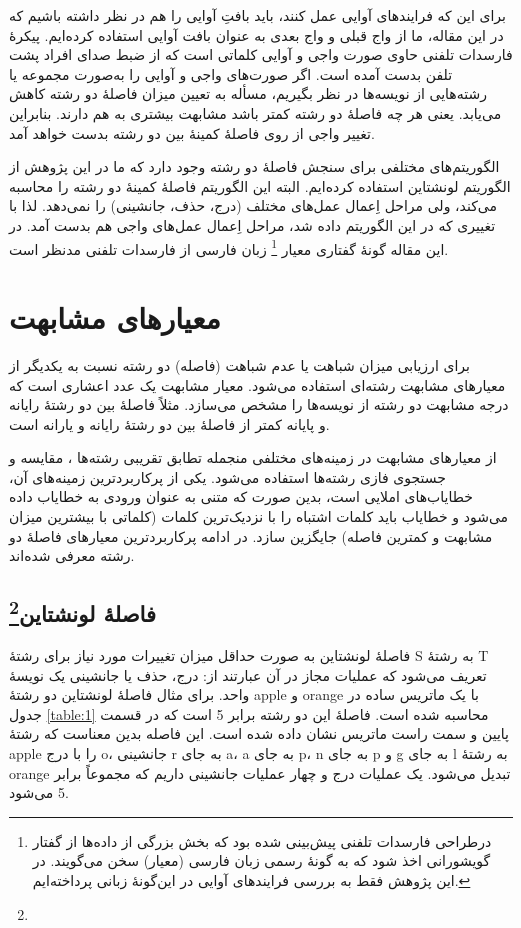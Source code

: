 \documentclass[12pt,onecolumn,a4paper]{article}
\begin{document}
    برای این که فرایندهای آوایی عمل کنند، باید بافتِ آوایی را هم در نظر داشته باشیم که در این مقاله، ما از واج قبلی و واج بعدی به عنوان بافت آوایی استفاده کرده‌ایم. پیکرهٔ فارسدات تلفنی حاوی صورت واجی و آوایی کلماتی است که از ضبط صدای افراد پشت تلفن بدست آمده است. اگر صورت‌های واجی و آوایی را به‌صورت مجموعه یا رشته‌هایی از نویسه‌ها در نظر بگیریم، مسأله به تعیین میزان فاصلۀ دو رشته کاهش می‌یابد. یعنی هر چه فاصلۀ دو رشته کمتر باشد مشابهت بیشتری به هم دارند. بنابراین تغییر واجی از روی فاصلۀ کمینۀ بین دو رشته بدست خواهد آمد.
    \par
    الگوریتم‌های مختلفی برای سنجش فاصلۀ دو رشته وجود دارد که ما در این پژوهش از الگوریتم لونشتاین  استفاده کرده‌ایم. البته این الگوریتم فاصلۀ کمینۀ دو رشته را محاسبه می‌کند، ولی مراحل اِعمال عمل‌های مختلف (درج، حذف، جانشینی) را نمی‌دهد. لذا با تغییری که در این الگوریتم داده شد، مراحل اِعمال عمل‌های واجی هم بدست آمد.
    در این مقاله گونهٔ گفتاری معیار
    \footnote{درطراحی فارسدات تلفنی پیش‌بینی شده بود که بخش بزرگی از داده‌ها از گفتار گویشورانی اخذ شود که به گونهٔ رسمی زبان فارسی (معیار) سخن می‌گویند. در این پژوهش فقط به بررسی فرایندهای آوایی در این‌گونهٔ زبانی پرداخته‌ایم.}
    زبان فارسی از فارسدات تلفنی مدنظر است.

    \section{معیارهای مشابهت}
    برای ارزیابی میزان شباهت یا عدم شباهت (فاصله) دو رشته نسبت به یکدیگر از معیارهای مشابهت رشته‌ای استفاده می‌شود. معیار مشابهت یک عدد اعشاری است که درجه مشابهت دو رشته از نویسه‌ها را مشخص می‌سازد. مثلاً فاصلۀ بین دو رشتۀ رایانه و پایانه کمتر از فاصلۀ بین دو رشتۀ رایانه و یارانه است.
    \par
    از معیارهای مشابهت در زمینه‌های مختلفی منجمله تطابق تقریبی رشته‌ها ، مقایسه  و جستجوی فازی رشته‌ها  استفاده می‌شود. یکی از پرکاربردترین زمینه‌های آن، خطایاب‌های املایی  است، بدین صورت که متنی به عنوان ورودی به خطایاب داده می‌شود و خطایاب باید کلمات اشتباه را با نزدیک‌ترین کلمات (کلماتی با بیشترین میزان مشابهت و کمترین فاصله) جایگزین سازد. در ادامه پرکاربردترین معیارهای فاصلۀ دو رشته معرفی شده‌اند.

    \subsection{فاصلۀ لونشتاین\protect\footnote{}}
    فاصلۀ لونشتاین  به صورت حداقل میزان تغییرات مورد نیاز برای رشتۀ S به رشتۀ T تعریف می‌شود که عملیات مجاز در آن عبارتند از: درج، حذف یا جانشینی یک نویسۀ واحد. برای مثال فاصلۀ لونشتاین دو رشتۀ apple و orange با یک ماتریس ساده در جدول \ref{table:1} محاسبه شده است. فاصلۀ این دو رشته برابر 5 است که در قسمت پایین و سمت راست ماتریس نشان داده شده است. این فاصله بدین معناست که رشتۀ apple را با درج o، جانشینی r به جای a، a به جای p، n به جای p و g به جای l به رشتۀ orange تبدیل می‌شود. یک عملیات درج و چهار عملیات جانشینی داریم که مجموعاً برابر 5 می‌شود.
\end{document}
